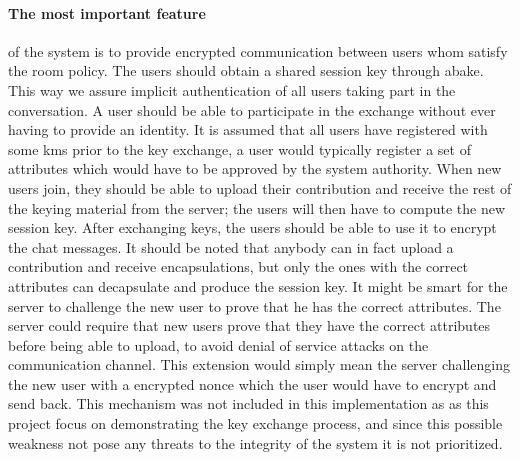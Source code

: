 \paragraph{The most important feature} of the system is to provide encrypted communication between users whom satisfy the room policy. The users should obtain a shared session key through \gls{abake}. This way we assure implicit authentication of all users taking part in the conversation. A user should be able to participate in the exchange without ever having to provide an identity. It is assumed that all users have registered with some \gls{kms} prior to the key exchange, a user would typically register a set of attributes which would have to be approved by the system authority. When new users join, they should be able to upload their contribution and receive the rest of the keying material from the server; the users will then have to compute the new session key. After exchanging keys, the users should be able to use it to encrypt the chat messages. It should be noted that anybody can in fact upload a contribution and receive encapsulations, but only the ones with the correct attributes can decapsulate and produce the session key. It might be smart for the server to challenge the new user to prove that he has the correct attributes. The server could require that new users prove that they have the correct attributes before being able to upload, to avoid denial of service attacks on the communication channel. This extension would simply mean the server challenging the new user with a encrypted nonce which the user would have to encrypt and send back. This mechanism was not included in this implementation as as this project focus on demonstrating the key exchange process, and since this possible weakness not pose any threats to the integrity of the system it is not prioritized. 


